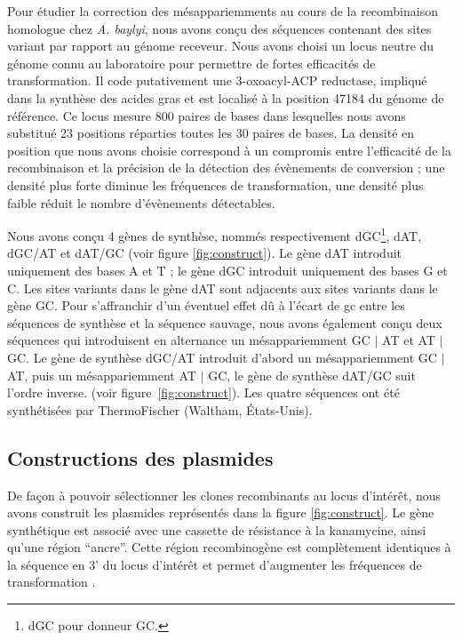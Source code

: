 Pour étudier la correction des mésappariemments au cours de la recombinaison
homologue chez \emph{A. baylyi}, nous avons conçu des séquences contenant des
sites variant par rapport au génome receveur. Nous avons choisi un locus neutre
du génome connu au laboratoire pour permettre de fortes efficacités de
transformation. Il code putativement une 3-oxoacyl-ACP reductase, impliqué dans
la synthèse des acides gras\cite{vallenet_microscopeintegrated_2013} et est
localisé à la position \num{47184} du génome de référence. Ce locus mesure
\num{800} paires de bases dans lesquelles nous avons substitué \num{23}
positions réparties toutes les \num{30} paires de bases. La densité en position
que nous avons choisie correspond à un compromis entre l'efficacité de la
recombinaison et la précision de la détection des évènements de conversion ; une
densité plus forte diminue les fréquences de transformation, une densité plus
faible réduit le nombre d'évènements détectables.

Nous avons conçu 4 gènes de synthèse, nommés respectivement dGC\footnote{dGC
  pour donneur GC.}, dAT, dGC/AT et dAT/GC (voir figure \ref{fig:construct}). Le
gène dAT introduit uniquement des bases A et T ; le gène dGC introduit
uniquement des bases G et C. Les sites variants dans le gène dAT sont adjacents
aux sites variants dans le gène GC. Pour s'affranchir d'un éventuel effet dû à
l'écart de \ac{gc} entre les séquences de synthèse et la séquence sauvage, nous
avons également conçu deux séquences qui introduisent en alternance un
mésappariemment GC $|$ AT et AT $|$ GC. Le gène de synthèse dGC/AT introduit
d'abord un mésappariemment GC $|$ AT, puis un mésappariemment AT $|$ GC, le gène
de synthèse dAT/GC suit l'ordre inverse. (voir figure~\ref{fig:construct}). Les
quatre séquences ont été synthétisées par ThermoFischer (Waltham, États-Unis).

\subsection{Constructions des plasmides}
\label{subsec:constructions}

De façon à pouvoir sélectionner les clones recombinants au locus d'intérêt, nous
avons construit les plasmides représentés dans la figure \ref{fig:construct}. Le
gène synthétique est associé avec une cassette de résistance à la kanamycine,
ainsi qu'une région ``ancre''. Cette région recombinogène est complètement
identiques à la séquence en 3' du locus d'intérêt et permet d'augmenter les
fréquences de transformation
\cite{de_vries_integration_2002,meier_mechanisms_2003}.

